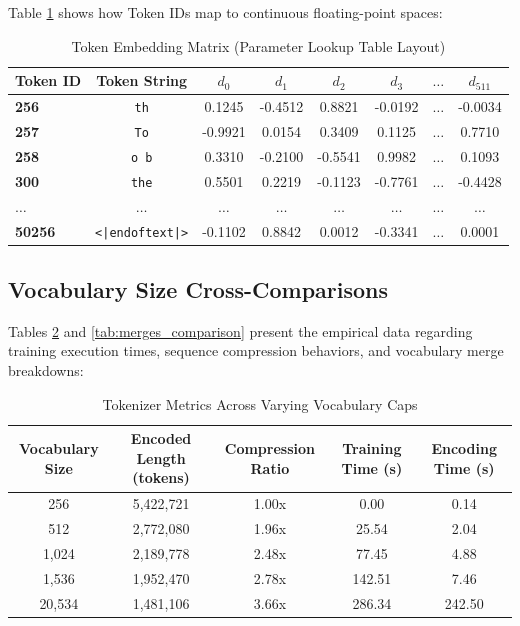 \documentclass{article}
\begin{document}
Table \ref{tab:embed_matrix} shows how Token IDs map to continuous floating-point spaces:

\begin{table}[h!]
\centering
\caption{Token Embedding Matrix (Parameter Lookup Table Layout)}
\label{tab:embed_matrix}
\begin{tabular}{lccccccc}
\toprule
\textbf{Token ID} & \textbf{Token String} & \textbf{$d_0$} & \textbf{$d_1$} & \textbf{$d_2$} & \textbf{$d_3$} & \textbf{$\dots$} & \textbf{$d_{511}$} \\
\midrule
\textbf{256} & \texttt{th} & 0.1245 & -0.4512 & 0.8821 & -0.0192 & $\dots$ & -0.0034 \\
\textbf{257} & \texttt{To} & -0.9921 & 0.0154 & 0.3409 & 0.1125 & $\dots$ & 0.7710 \\
\textbf{258} & \texttt{o b} & 0.3310 & -0.2100 & -0.5541 & 0.9982 & $\dots$ & 0.1093 \\
\textbf{300} & \texttt{the} & 0.5501 & 0.2219 & -0.1123 & -0.7761 & $\dots$ & -0.4428 \\
$\dots$ & $\dots$ & $\dots$ & $\dots$ & $\dots$ & $\dots$ & $\dots$ & $\dots$ \\
\textbf{50256} & \texttt{\textless|endoftext|\textgreater} & -0.1102 & 0.8842 & 0.0012 & -0.3341 & $\dots$ & 0.0001 \\
\bottomrule
\end{tabular}
\end{table}

\subsection{Vocabulary Size Cross-Comparisons}
Tables \ref{tab:metrics_comparison} and \ref{tab:merges_comparison} present the empirical data regarding training execution times, sequence compression behaviors, and vocabulary merge breakdowns:

\begin{table}[h!]
\centering
\caption{Tokenizer Metrics Across Varying Vocabulary Caps}
\label{tab:metrics_comparison}
\begin{tabular}{ccccc}
\toprule
\textbf{Vocabulary Size} & \textbf{Encoded Length (tokens)} & \textbf{Compression Ratio} & \textbf{Training Time (s)} & \textbf{Encoding Time (s)} \\
\midrule
256 & 5,422,721 & 1.00x & 0.00 & 0.14 \\
512 & 2,772,080 & 1.96x & 25.54 & 2.04 \\
1,024 & 2,189,778 & 2.48x & 77.45 & 4.88 \\
1,536 & 1,952,470 & 2.78x & 142.51 & 7.46 \\
20,534 & 1,481,106 & 3.66x & 286.34 & 242.50 \\
\bottomrule
\end{tabular}
\end{table}
\end{document}
